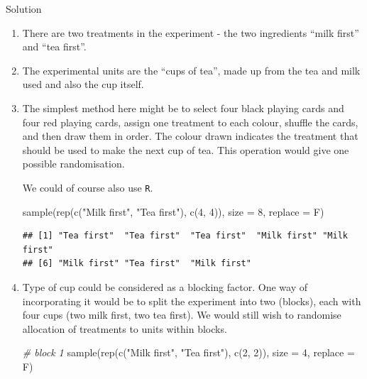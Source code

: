 \documentclass[
]{book}
\newenvironment{Shaded}{\begin{snugshade}}{\end{snugshade}}
\newcommand{\AttributeTok}[1]{\textcolor[rgb]{0.77,0.63,0.00}{#1}}
\newcommand{\CommentTok}[1]{\textcolor[rgb]{0.56,0.35,0.01}{\textit{#1}}}
\newcommand{\DecValTok}[1]{\textcolor[rgb]{0.00,0.00,0.81}{#1}}
\newcommand{\FunctionTok}[1]{\textcolor[rgb]{0.00,0.00,0.00}{#1}}
\newcommand{\NormalTok}[1]{#1}
\newcommand{\StringTok}[1]{\textcolor[rgb]{0.31,0.60,0.02}{#1}}
\theoremstyle{definition}
\theoremstyle{definition}
\theoremstyle{definition}
\theoremstyle{definition}
\theoremstyle{remark}
\begin{document}
Solution

\begin{enumerate}
\def\labelenumi{\alph{enumi}.}
\item
  There are two treatments in the experiment - the two ingredients ``milk first'' and ``tea first''.
\item
  The experimental units are the ``cups of tea'', made up from the tea and milk used and also the cup itself.
\item
  The simplest method here might be to select four black playing cards and four red playing cards, assign one treatment to each colour, shuffle the cards, and then draw them in order. The colour drawn indicates the treatment that should be used to make the next cup of tea. This operation would give one possible randomisation.

  We could of course also use \texttt{R}.

\begin{Shaded}
\begin{Highlighting}[]
\FunctionTok{sample}\NormalTok{(}\FunctionTok{rep}\NormalTok{(}\FunctionTok{c}\NormalTok{(}\StringTok{"Milk first"}\NormalTok{, }\StringTok{"Tea first"}\NormalTok{), }\FunctionTok{c}\NormalTok{(}\DecValTok{4}\NormalTok{, }\DecValTok{4}\NormalTok{)), }\AttributeTok{size =} \DecValTok{8}\NormalTok{, }\AttributeTok{replace =}\NormalTok{ F)}
\end{Highlighting}
\end{Shaded}

\begin{verbatim}
## [1] "Tea first"  "Tea first"  "Tea first"  "Milk first" "Milk first"
## [6] "Milk first" "Tea first"  "Milk first"
\end{verbatim}
\item
  Type of cup could be considered as a blocking factor. One way of incorporating it would be to split the experiment into two (blocks), each with four cups (two milk first, two tea first). We would still wish to randomise allocation of treatments to units within blocks.

\begin{Shaded}
\begin{Highlighting}[]
\CommentTok{\# block 1}
\FunctionTok{sample}\NormalTok{(}\FunctionTok{rep}\NormalTok{(}\FunctionTok{c}\NormalTok{(}\StringTok{"Milk first"}\NormalTok{, }\StringTok{"Tea first"}\NormalTok{), }\FunctionTok{c}\NormalTok{(}\DecValTok{2}\NormalTok{, }\DecValTok{2}\NormalTok{)), }\AttributeTok{size =} \DecValTok{4}\NormalTok{, }\AttributeTok{replace =}\NormalTok{ F)}
\end{Highlighting}
\end{Shaded}


\end{enumerate}
\end{document}
